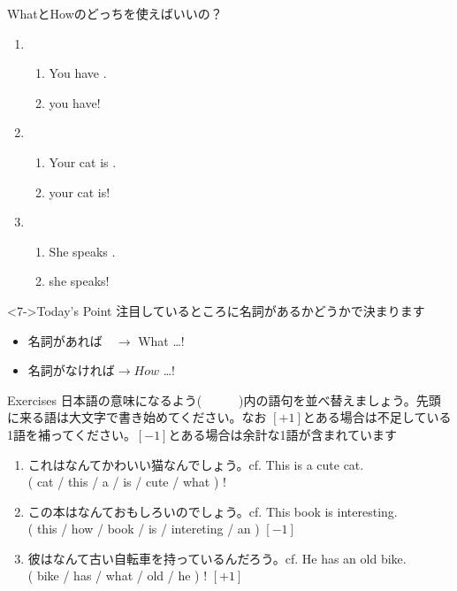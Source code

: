 \documentclass[aspectratio=169,xcolor={dvipsnames,table}]{beamer}
\begin{document}
\begin{frame}[plain]{WhatとHowのどっちを使えばいいの？}
 \begin{enumerate}
  \item<1-> \begin{enumerate}
	 \item<1-> You have .
	 \item<2->  you have!
	\end{enumerate}
  \item<3-> \begin{enumerate}
	 \item<3-> Your cat is .
	 \item<4->  your cat is!
	\end{enumerate}
  \item<5-> \begin{enumerate}
	 \item<5-> She speaks .
	 \item<6->  she speaks!
	\end{enumerate}
 \end{enumerate}

\begin{block}<7->{Today's Point}\small
注目しているところに名詞があるかどうかで決まります
\begin{itemize}[square]\small
 \item 名詞があれば　$\longrightarrow$ What \ldots !
 \item 名詞がなければ$\longrightarrow How$ \ldots !
\end{itemize}
\end{block}
\hfill{\scriptsize {}}
\end{frame}
\begin{frame}[plain]{Exercises}
日本語の意味になるよう(~~~~~~)内の語句を並べ替えましょう。先頭に来る語は大文字で書き始めてください。なお $[ +1 ]$とある場合は不足している1語を補ってください。$[ -1 ]$とある場合は余計な1語が含まれています\hfill{\scriptsize {}}
 \
 \begin{enumerate}
  \item これはなんてかわいい猫なんでしょう。\hfill{\scriptsize cf. This is a cute cat.}\\
	( cat / this / a / is / cute / what ) !\\
  \item この本はなんておもしろいのでしょう。\hfill{\scriptsize cf. This book is interesting.}\\
	( this / how / book / is / intereting / an ) $[ -1 ]$\\
  \item 彼はなんて古い自転車を持っているんだろう。\hfill{\scriptsize cf. He has an old bike.}\\
	( bike / has / what / old / he ) ! $[ +1 ]$\\
 \end{enumerate}
\end{frame}
\end{document}
